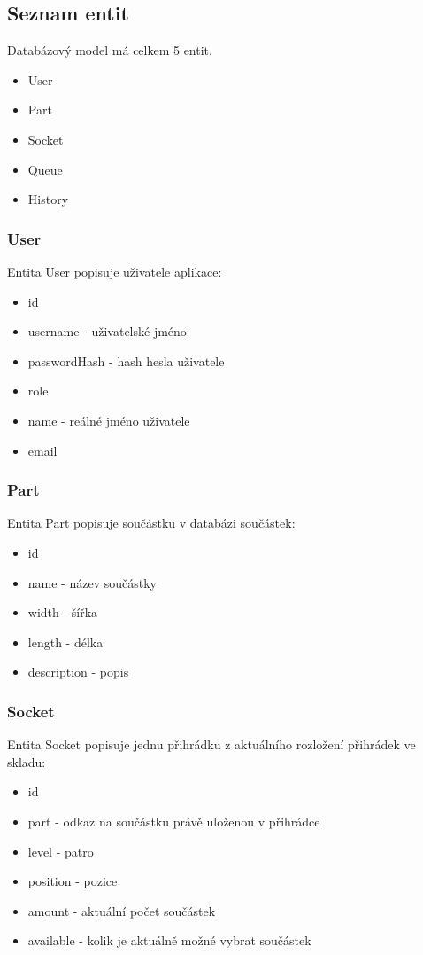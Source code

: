\documentclass[12pt, a4paper, oneside]{article}
\begin{document}
\newpage
\subsection{Seznam entit}

Databázový model má celkem 5 entit.
\begin{itemize}
\item User
\item Part
\item Socket
\item Queue
\item History
\end{itemize}

\subsubsection{User}

Entita User popisuje uživatele aplikace:
\begin{itemize}
\item id
\item username - uživatelské jméno
\item passwordHash - hash hesla uživatele
\item role
\item name - reálné jméno uživatele
\item email
\end{itemize}

\subsubsection{Part}

Entita Part popisuje součástku v databázi součástek:
\begin{itemize}
\item id
\item name - název součástky
\item width - šířka
\item length - délka
\item description - popis
\end{itemize}

\subsubsection{Socket}

Entita Socket popisuje jednu přihrádku z aktuálního rozložení přihrádek ve skladu:
\begin{itemize}
\item id
\item part - odkaz na součástku právě uloženou v přihrádce
\item level - patro
\item position - pozice
\item amount - aktuální počet součástek
\item available - kolik je aktuálně možné vybrat součástek
\end{itemize}
\end{document}
